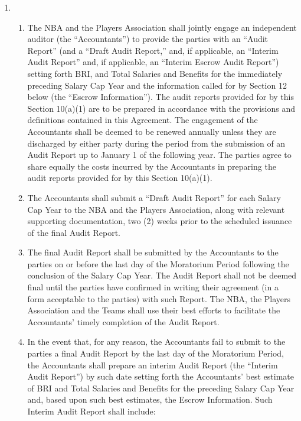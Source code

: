 \documentclass[
]{book}
\begin{document}
\begin{enumerate}
\def\labelenumi{(\alph{enumi})}
\item
  \begin{enumerate}
  \def\labelenumii{(\arabic{enumii})}
  \item
    The NBA and the Players Association shall jointly engage an independent auditor (the ``Accountants'') to provide the parties with an ``Audit Report'' (and a ``Draft Audit Report,'' and, if applicable, an ``Interim Audit Report'' and, if applicable, an ``Interim Escrow Audit Report'') setting forth BRI, and Total Salaries and Benefits for the immediately preceding Salary Cap Year and the information called for by Section 12 below (the ``Escrow Information''). The audit reports provided for by this Section 10(a)(1) are to be prepared in accordance with the provisions and definitions contained in this Agreement. The engagement of the Accountants shall be deemed to be renewed annually unless they are discharged by either party during the period from the submission of an Audit Report up to January 1 of the following year. The parties agree to share equally the costs incurred by the Accountants in preparing the audit reports provided for by this Section 10(a)(1).
  \item
    The Accountants shall submit a ``Draft Audit Report'' for each Salary Cap Year to the NBA and the Players Association, along with relevant supporting documentation, two (2) weeks prior to the scheduled issuance of the final Audit Report.
  \item
    The final Audit Report shall be submitted by the Accountants to the parties on or before the last day of the Moratorium Period following the conclusion of the Salary Cap Year. The Audit Report shall not be deemed final until the parties have confirmed in writing their agreement (in a form acceptable to the parties) with such Report. The NBA, the Players Association and the Teams shall use their best efforts to facilitate the Accountants' timely completion of the Audit Report.
  \item
    In the event that, for any reason, the Accountants fail to submit to the parties a final Audit Report by the last day of the Moratorium Period, the Accountants shall prepare an interim Audit Report (the ``Interim Audit Report'') by such date setting forth the Accountants' best estimate of BRI and Total Salaries and Benefits for the preceding Salary Cap Year and, based upon such best estimates, the Escrow Information. Such Interim Audit Report shall include:


\end{enumerate}
\end{enumerate}
\end{document}
